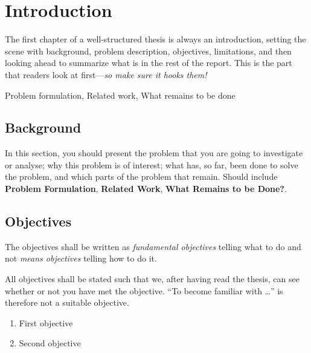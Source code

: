 \chapter{Introduction}
\label{chp:introduction}
\begin{info}
	The first chapter of a well-structured thesis is always an introduction, setting the scene with background, problem description, objectives, limitations, and then looking ahead to summarize what is in the rest of the report. This is the part that readers look at first---\emph{so make sure it hooks them!}

	Problem formulation,
	Related work,
	What remains to be done
\end{info}



\section{Background}
\label{sec:background}
\begin{info}
	In this section, you should present the problem that you are going to investigate or analyse; why this problem is of interest; what has, so far, been done to solve the problem, and which parts of the problem that remain. Should include \textbf{Problem Formulation}, \textbf{Related Work}, \textbf{What Remains to be Done?}.
\end{info}



\section{Objectives}
\label{sec:objectives}
\begin{info}
	The objectives shall be written as \emph{fundamental objectives} telling what to do and not \emph{means objectives} telling how to do it.

	All objectives shall be stated such that we, after having read the thesis, can see whether or not you have met the objective. ``To become familiar with \ldots'' is therefore not a suitable objective.
\end{info}


\begin{enumerate}
	\item First objective
	\item Second objective
\end{enumerate}


